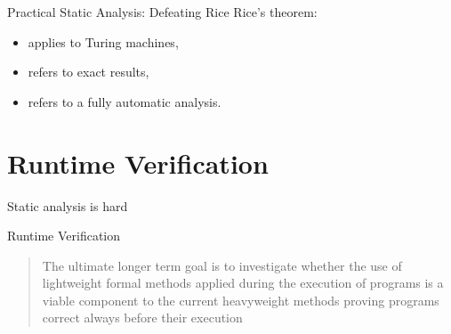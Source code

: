 \documentclass[12pt]{beamer}
\begin{document}
\begin{frame}{Practical Static Analysis: \small Defeating Rice}
  Rice's theorem:
  \begin{itemize}
    \item applies to Turing machines,
    \item refers to exact results,
    \item refers to a fully automatic analysis.
  \end{itemize}


\end{frame}


\section{Runtime Verification}
\label{sec:runver}

\begin{frame}
  \begin{center}
    \Large Static analysis is hard

  \end{center}
\end{frame}

\begin{frame}{Runtime Verification}

  \begin{quote}
    The ultimate longer term goal is to investigate whether the use of
    lightweight formal methods applied during the execution of
    programs is a viable component to the current heavyweight methods
    proving programs correct always before their execution

  \end{quote}
\end{frame}
\end{document}
